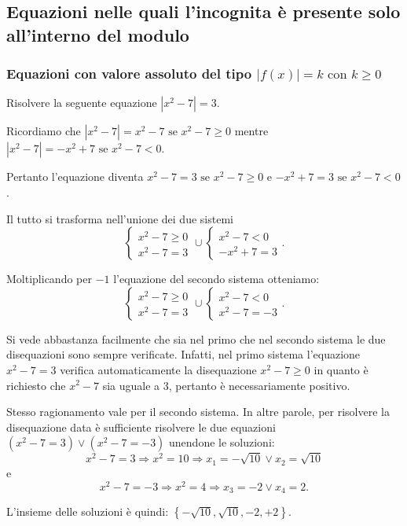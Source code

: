 \subsection{Equazioni nelle quali l'incognita è presente solo all'interno del modulo}

\subsubsection*{Equazioni con valore assoluto del tipo ${\left|f(x)\right|=k\text{ con }k\ge 0}$}

\begin{exrig}
\begin{esempio}
Risolvere la seguente equazione $\left|x^2-7\right|=3$.

Ricordiamo che $\left|x^2-7\right|=x^2-7\text{ se }x^2-7\ge 0$ mentre $\left|x^2-7\right|=-x^2+7\text{ se }x^2-7<0$.

Pertanto l'equazione diventa $x^2-7=3\text{ se }x^2-7\ge 0$ e $-x^2+7=3\text{ se }x^2-7<0$.

Il tutto si trasforma nell'unione dei due sistemi 
\[\left\{\begin{array}{l}{x^2-7\ge 0}\\{x^2-7=3}\end{array}\right.\cup \left\{\begin{array}{l}{x^2-7<0}\\{-x^2+7=3}\end{array}\right..\]

Moltiplicando per $-1$ l'equazione del secondo sistema otteniamo: \[ \left\{\begin{array}{l}{x^2-7\ge 0}\\{x^2-7=3}\end{array}\right.\cup \left\{\begin{array}{l}{x^2-7<0}\\{x^2-7=-3}\end{array}\right.. \]

Si vede abbastanza facilmente che sia nel primo che nel secondo sistema le due disequazioni sono sempre verificate. Infatti, nel primo sistema l'equazione $x^2-7=3$ verifica automaticamente la disequazione $x^2-7\ge 0$ in quanto è richiesto che $x^2-7$ sia uguale a 3, pertanto è necessariamente positivo.

Stesso ragionamento vale per il secondo sistema. In altre parole, per risolvere la disequazione data è sufficiente risolvere le due equazioni $\left(x^2-7=3\right)\vee \left(x^2-7=-3\right)$ unendone le soluzioni:
 \[x^2-7=3\Rightarrow x^2=10\Rightarrow x_1=-\sqrt{10}\vee x_2=\sqrt{10}\]
e \[x^2-7=-3\Rightarrow x^2=4\Rightarrow x_3=-2\vee x_4=2.\]

L'insieme delle soluzioni è quindi: $\left\{-\sqrt{10},\sqrt{10},-2,+2\right\}$.
\end{esempio}
\end{exrig}

